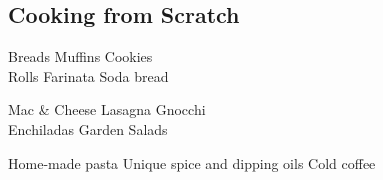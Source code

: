 \documentclass[]{resume-openfont}
\begin{document}
\begin{minipage}[t]{0.33\textwidth}
\subsection{Cooking from Scratch}
\textbullet{} Breads \textbullet{} Muffins \textbullet{} Cookies \\
\textbullet{} Rolls \textbullet{}Farinata \textbullet{} Soda bread


\textbullet{} Mac \& Cheese \textbullet{} Lasagna \textbullet{} Gnocchi \\
\textbullet{} Enchiladas \textbullet{} Garden Salads

\textbullet{} Home-made pasta \textbullet{} Unique spice and dipping oils \textbullet{} Cold coffee
\sectionsep



%
%

\end{minipage} 
\hfill
\end{document}
